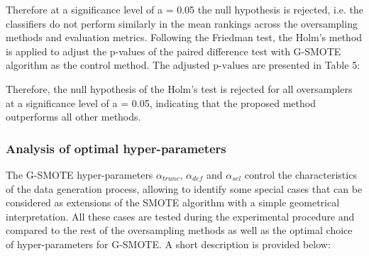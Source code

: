 \documentclass[parskip=full]{scrartcl}
\begin{document}
Therefore at a significance level of a = 0.05 the null hypothesis is rejected, i.e. the classifiers do not perform similarly in the mean rankings across the oversampling methods and evaluation metrics. Following the Friedman test, the Holm's method is applied to adjust the p-values of the paired difference test with G-SMOTE algorithm as the control method. The adjusted $\text{p-values}$ are presented in Table 5:


Therefore, the null hypothesis of the Holm's test is rejected for all oversamplers at a significance level of a = 0.05, indicating that the proposed method outperforms all other methods.

\subsubsection{Analysis of optimal hyper-parameters}

The G-SMOTE hyper-parameters \( \alpha_{trunc} \), \( \alpha_{def} \) and \( \alpha_{sel} \) control the characteristics of the data generation process, allowing to identify some special cases that can be considered as extensions of the SMOTE algorithm with a simple geometrical interpretation. All these cases are tested during the experimental procedure and compared to the rest of the oversampling methods as well as the optimal choice of hyper-parameters for G-SMOTE. A short description is provided below:
\end{document}
